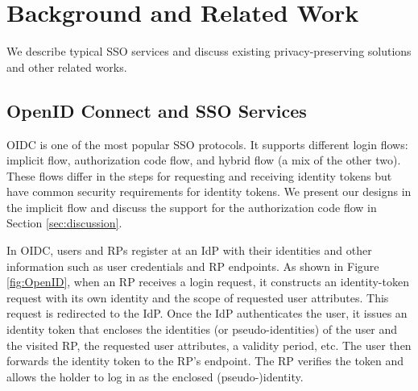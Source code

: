 \section{Background and Related Work}
\label{sec:background}

We describe %
typical SSO services and discuss existing privacy-preserving solutions and other related works.

\subsection{OpenID Connect and SSO Services}
\label{subsec:OIDC}
OIDC is one of the most popular SSO protocols. It supports different login flows: implicit flow, authorization code flow, and hybrid flow (a mix of the other two). These flows differ in the steps for requesting and receiving identity tokens but have common security requirements for identity tokens. We present our designs in the implicit flow and discuss the support for the authorization code flow in Section \ref{sec:discussion}.

In OIDC, users and RPs register at an IdP with their identities
and other information such as user credentials %
and RP endpoints. %
As shown in Figure \ref{fig:OpenID}, when an RP receives a login request, it constructs an identity-token request with its own identity and the scope of requested user attributes.
This request is redirected to the IdP. Once the IdP authenticates the user, it issues an identity token that encloses the identities (or pseudo-identities) of the user and the visited RP, the requested user attributes, a validity period, etc. The user then forwards the identity token to the RP's endpoint. The RP verifies the token and allows the holder to log in as the enclosed (pseudo-)identity.


